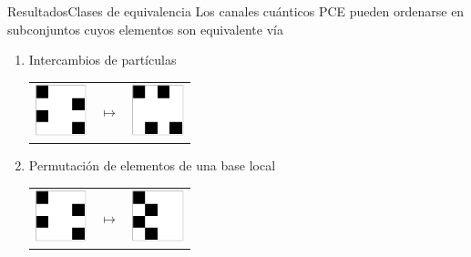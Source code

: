 \documentclass[xcolor=dvipsnames,presentation]{beamer}%
\begin{document}
\begin{frame}{Resultados}{Clases de equivalencia}
	Los canales cuánticos PCE pueden ordenarse en subconjuntos cuyos elementos
	son equivalente vía \vfill
	\begin{enumerate}
		\item Intercambios de partículas
		\begin{center}
		\begin{tabular}{m{1.5cm} m{1.2cm} m{1.5cm}}
		\includegraphics[height=1.5cm]{2qubits_PCE_QC_001}
		& \hspace{\fill} \Large$\longmapsto$ \hspace{\fill}
		& \includegraphics[height=1.5cm]{2qubits_PCE_QC_003}
		\end{tabular}
		\end{center}\vfill 
		
		\item Permutación de elementos de una base local
		
		\begin{center}
		\begin{tabular}{m{1.5cm} m{1.2cm} m{1.5cm}}
		\includegraphics[height=1.5cm]{2qubits_PCE_QC_001}
		& \hspace{\fill} \Large$\longmapsto$ \hspace{\fill}
		& \includegraphics[height=1.5cm]{2qubits_PCE_QC_004}
		\end{tabular}
		\end{center}
	\end{enumerate}\vfill
\end{frame}
\end{document}
